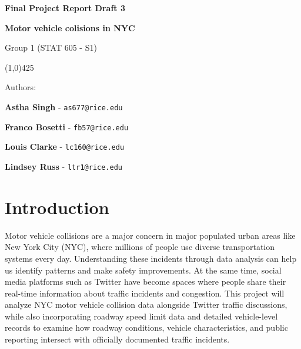 \documentclass[10pt]{article}\usepackage[]{graphicx}\usepackage[]{xcolor}
\begin{document}
\begin{titlepage}
    \centering
    
    { \Huge \textbf{Final Project Report Draft 3} \par} 
    \vspace{5mm}
    { \huge \textbf{Motor vehicle colisions in NYC} \par} 
    \vspace{3mm}
    { \Large Group 1 (STAT 605 - S1)\par}  
    
    \vspace{5mm}
    \begin{center}
    \line(1,0){425}
    \end{center}
    
    \vspace{5mm}

    \vspace{15mm}
    { \large Authors: \par }
      \vspace{3mm}
    { \Large \textbf{Astha Singh} - \texttt{as677@rice.edu} \par}
    { \Large \textbf{Franco Bosetti} - \texttt{fb57@rice.edu}\par}
    { \Large \textbf{Louis Clarke} - \texttt{lc160@rice.edu}\par}
    { \Large \textbf{Lindsey Russ} - \texttt{ltr1@rice.edu}\par}
    
    
    \vspace{5mm}
    
    \vspace{5mm}

\end{titlepage}

\newpage


\tableofcontents

\newpage

\section{Introduction}

Motor vehicle collisions are a major concern in major populated urban areas like New York City (NYC), where millions of people use diverse transportation systems every day. Understanding these incidents through data analysis can help us identify patterns and make safety improvements. At the same time, social media platforms such as Twitter have become spaces where people share their real-time information about traffic incidents and congestion. This project will analyze NYC motor vehicle collision data alongside Twitter traffic discussions, while also incorporating roadway speed limit data and detailed vehicle-level records to examine how roadway conditions, vehicle characteristics, and public reporting intersect with officially documented traffic incidents.
\end{document}
